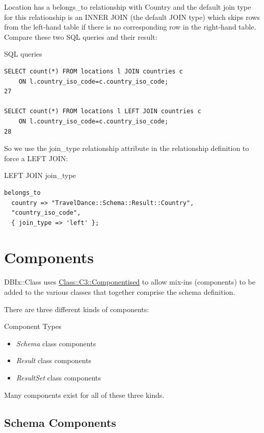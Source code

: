 Location has a belongs\_to relationship with Country and the default join
type for this relationship is an INNER JOIN (the default JOIN type) which
skips rows from the left-hand table if there is no corresponding row in the
right-hand table. Compare these two SQL queries and their result: 

\begin{frame}[fragile]{SQL queries}
\begin{lstlisting}
SELECT count(*) FROM locations l JOIN countries c
    ON l.country_iso_code=c.country_iso_code;
27

SELECT count(*) FROM locations l LEFT JOIN countries c
    ON l.country_iso_code=c.country_iso_code;
28
\end{lstlisting}
\end{frame}

So we use the join\_type relationship attribute in the relationship definition to force a LEFT JOIN:

\begin{frame}[fragile]{LEFT JOIN join\_type}
\begin{lstlisting}
belongs_to
  country => "TravelDance::Schema::Result::Country",
  "country_iso_code",
  { join_type => 'left' };
\end{lstlisting}
\end{frame}

\section{Components}
DBIx::Class uses \href{https://metacpan.org/pod/Class::C3::Componentised}
{Class::C3::Componentised} to allow mix-ins (components) to be added to the 
various classes that together comprise the schema definition. 

There are three different kinds of components:

\begin{frame}{Component Types}
\begin{itemize}
\item \emph{Schema} class components
\item \emph{Result} class components
\item \emph{ResultSet} class components
\end{itemize}
\end{frame}
 
Many components exist for all of these three kinds.

\subsection{Schema Components}

